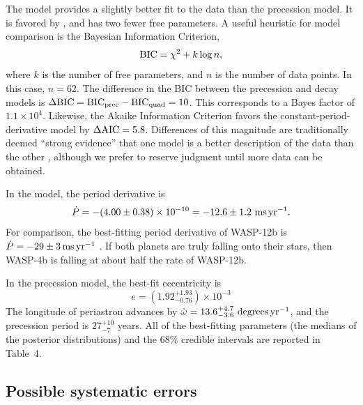 \documentclass[12pt,twocolumn,tighten]{aastex62}
\begin{document}
The  model provides a slightly
better fit to the data than the precession model.  It is favored by
, and has two
fewer free parameters.  A useful heuristic for model comparison is the
Bayesian Information Criterion,
\begin{equation}
  {\rm BIC} = \chi^2 + k\log n,
\end{equation}
where $k$ is the number of free parameters, and $n$ is the number of
data points. In this case, $n=62$.  The difference in the BIC between
the precession and decay models is $\Delta {\rm BIC} = {\rm BIC}_{\rm
prec} - {\rm BIC}_{\rm quad} = 10$. This corresponds to a Bayes factor of
$1.1\times 10^{4}$.  Likewise, the Akaike Information Criterion favors
the constant-period-derivative model by $\Delta {\rm AIC} = 5.8$.
Differences of this magnitude are traditionally deemed ``strong
evidence'' that one model is a better description of the data than the
other \citep{kass_bayes_1995}, although we prefer to reserve judgment
until more data can be obtained.

In the  model, the period
derivative is
\begin{equation}
\dot{P}
  = - (4.00 \pm 0.38)\times 10^{-10}
  = - 12.6 \pm 1.2~{\rm ms}\,{\rm yr}^{-1}.
  \label{eq:dP_dt_obs}
\end{equation}
For comparison, the best-fitting period derivative of WASP-12b is
$\dot{P} = -29 \pm 3\,{\rm ms}\,{\rm yr}^{-1}$
\citep{maciejewski_departure_2016,patra_2017}.  If both planets are
truly falling onto their stars, then WASP-4b is falling at about half
the rate of WASP-12b.

In the precession model, the best-fit eccentricity is
\begin{equation}
  e = (1.92^{+ 1.93}_{- 0.76})\times10^{-3}
  \label{eq:e_obs}
\end{equation}
The longitude of periastron advances by $\dot{\omega} =
13.6^{+4.7}_{-3.6}\ {\rm degrees}\,{\rm yr}^{-1}$, and the precession
period is $27^{+10}_{-7}$ years.  All of the best-fitting parameters
(the medians of the posterior distributions) and the 68\% credible
intervals are reported in Table~4.


\subsection{Possible systematic errors}
\end{document}

